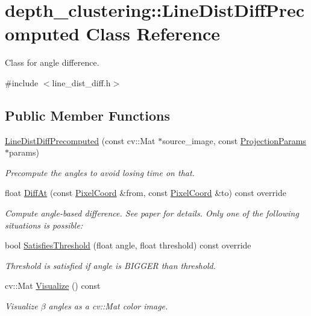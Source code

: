 \hypertarget{classdepth__clustering_1_1LineDistDiffPrecomputed}{}\section{depth\+\_\+clustering\+:\+:Line\+Dist\+Diff\+Precomputed Class Reference}
\label{classdepth__clustering_1_1LineDistDiffPrecomputed}


Class for angle difference.  




{\ttfamily \#include $<$line\+\_\+dist\+\_\+diff.\+h$>$}

\subsection*{Public Member Functions}
\begin{DoxyCompactItemize}
\item 
\hyperlink{classdepth__clustering_1_1LineDistDiffPrecomputed_a035909e1718ad9b54b9b4116bbb6c408}{Line\+Dist\+Diff\+Precomputed} (const cv\+::\+Mat $\ast$source\+\_\+image, const \hyperlink{classdepth__clustering_1_1ProjectionParams}{Projection\+Params} $\ast$params)
\begin{DoxyCompactList}\small\item\em Precompute the angles to avoid losing time on that. \end{DoxyCompactList}\item 
float \hyperlink{classdepth__clustering_1_1LineDistDiffPrecomputed_ac505afaa537656af1bcc342ab1e910c4}{Diff\+At} (const \hyperlink{structdepth__clustering_1_1PixelCoord}{Pixel\+Coord} \&from, const \hyperlink{structdepth__clustering_1_1PixelCoord}{Pixel\+Coord} \&to) const override
\begin{DoxyCompactList}\small\item\em Compute angle-\/based difference. See paper for details. Only one of the following situations is possible\+: \end{DoxyCompactList}\item 
\mbox{\label{classdepth__clustering_1_1LineDistDiffPrecomputed_ac3ce8196d5e6f49f3e3bdc3e3b32b033}} 
bool \hyperlink{classdepth__clustering_1_1LineDistDiffPrecomputed_ac3ce8196d5e6f49f3e3bdc3e3b32b033}{Satisfies\+Threshold} (float angle, float threshold) const override
\begin{DoxyCompactList}\small\item\em Threshold is satisfied if angle is B\+I\+G\+G\+ER than threshold. \end{DoxyCompactList}\item 
cv\+::\+Mat \hyperlink{classdepth__clustering_1_1LineDistDiffPrecomputed_a77c9cf3bea954f13cd2fef4f8a182425}{Visualize} () const
\begin{DoxyCompactList}\small\item\em Visualize $\beta$ angles as a {\ttfamily cv\+::\+Mat} color image. \end{DoxyCompactList}\end{DoxyCompactItemize}

